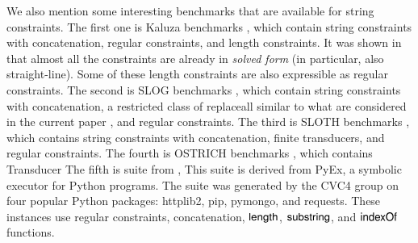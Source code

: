 We also mention some interesting benchmarks that are available for string constraints. The first one is Kaluza benchmarks \cite{Berkeley-JavaScript}, which contain
string constraints with concatenation, regular constraints, and length constraints. It was shown in \cite{Vijay-length} that almost all the constraints are already in \emph{solved form} (in particular, also straight-line). Some of these length constraints are also expressible as regular constraints.
%
The second is SLOG benchmarks \cite{fang-yu-circuits}, which contain string constraints with concatenation, a restricted class of replaceall similar to what are considered in the current paper , and regular constraints. 
%
The third is SLOTH benchmarks \cite{HJLRV18}, which contains string constraints with concatenation, finite transducers, and regular constraints. 
% 
The fourth is OSTRICH benchmarks \cite{CHL+19}, which contains Transducer
%
%
The fifth is {\pyexbench} suite from \cite{ReynoldsWBBLT17}, This suite is derived from PyEx, a symbolic executor for Python programs. The {\pyexbench} suite was generated by the CVC4 group on four popular Python packages: httplib2, pip, pymongo, and requests. These instances use regular constraints, concatenation, $\mathsf{length}$, $\mathsf{substring}$, and $\mathsf{indexOf}$ functions. 
 
